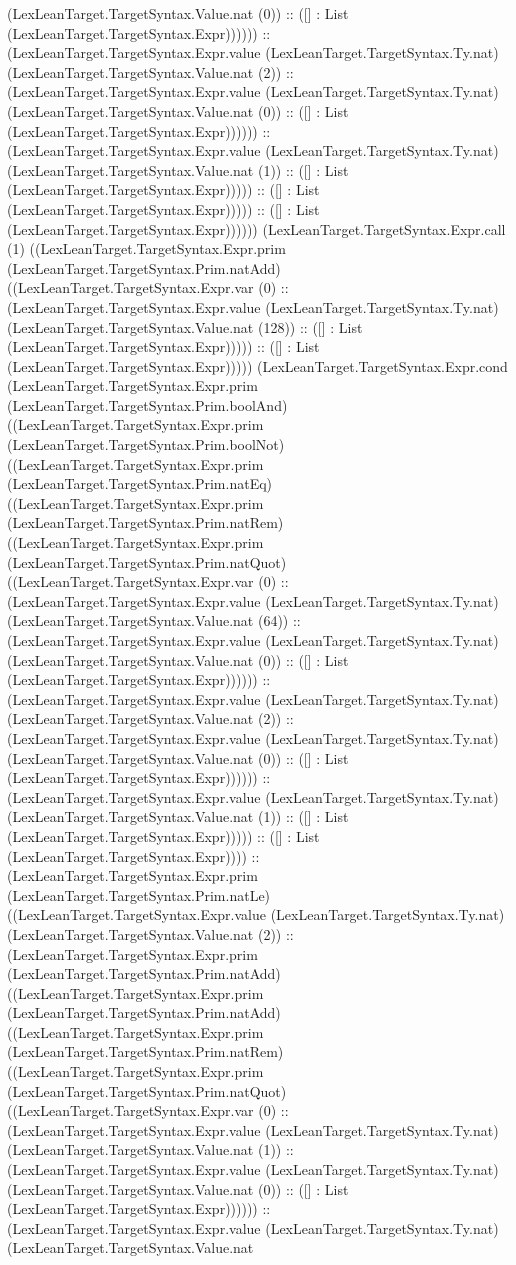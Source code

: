 \documentclass[11pt]{article}
\begin{document}
(LexLeanTarget.TargetSyntax.Value.nat (0)) :: ([] : List (LexLeanTarget.TargetSyntax.Expr)))))) :: (LexLeanTarget.TargetSyntax.Expr.value (LexLeanTarget.TargetSyntax.Ty.nat) (LexLeanTarget.TargetSyntax.Value.nat (2)) :: (LexLeanTarget.TargetSyntax.Expr.value (LexLeanTarget.TargetSyntax.Ty.nat) (LexLeanTarget.TargetSyntax.Value.nat (0)) :: ([] : List (LexLeanTarget.TargetSyntax.Expr)))))) :: (LexLeanTarget.TargetSyntax.Expr.value (LexLeanTarget.TargetSyntax.Ty.nat) (LexLeanTarget.TargetSyntax.Value.nat (1)) :: ([] : List (LexLeanTarget.TargetSyntax.Expr))))) :: ([] : List (LexLeanTarget.TargetSyntax.Expr))))) :: ([] : List (LexLeanTarget.TargetSyntax.Expr)))))) (LexLeanTarget.TargetSyntax.Expr.call (1) ((LexLeanTarget.TargetSyntax.Expr.prim (LexLeanTarget.TargetSyntax.Prim.natAdd) ((LexLeanTarget.TargetSyntax.Expr.var (0) :: (LexLeanTarget.TargetSyntax.Expr.value (LexLeanTarget.TargetSyntax.Ty.nat) (LexLeanTarget.TargetSyntax.Value.nat (128)) :: ([] : List (LexLeanTarget.TargetSyntax.Expr))))) :: ([] : List (LexLeanTarget.TargetSyntax.Expr))))) (LexLeanTarget.TargetSyntax.Expr.cond (LexLeanTarget.TargetSyntax.Expr.prim (LexLeanTarget.TargetSyntax.Prim.boolAnd) ((LexLeanTarget.TargetSyntax.Expr.prim (LexLeanTarget.TargetSyntax.Prim.boolNot) ((LexLeanTarget.TargetSyntax.Expr.prim (LexLeanTarget.TargetSyntax.Prim.natEq) ((LexLeanTarget.TargetSyntax.Expr.prim (LexLeanTarget.TargetSyntax.Prim.natRem) ((LexLeanTarget.TargetSyntax.Expr.prim (LexLeanTarget.TargetSyntax.Prim.natQuot) ((LexLeanTarget.TargetSyntax.Expr.var (0) :: (LexLeanTarget.TargetSyntax.Expr.value (LexLeanTarget.TargetSyntax.Ty.nat) (LexLeanTarget.TargetSyntax.Value.nat (64)) :: (LexLeanTarget.TargetSyntax.Expr.value (LexLeanTarget.TargetSyntax.Ty.nat) (LexLeanTarget.TargetSyntax.Value.nat (0)) :: ([] : List (LexLeanTarget.TargetSyntax.Expr)))))) :: (LexLeanTarget.TargetSyntax.Expr.value (LexLeanTarget.TargetSyntax.Ty.nat) (LexLeanTarget.TargetSyntax.Value.nat (2)) :: (LexLeanTarget.TargetSyntax.Expr.value (LexLeanTarget.TargetSyntax.Ty.nat) (LexLeanTarget.TargetSyntax.Value.nat (0)) :: ([] : List (LexLeanTarget.TargetSyntax.Expr)))))) :: (LexLeanTarget.TargetSyntax.Expr.value (LexLeanTarget.TargetSyntax.Ty.nat) (LexLeanTarget.TargetSyntax.Value.nat (1)) :: ([] : List (LexLeanTarget.TargetSyntax.Expr))))) :: ([] : List (LexLeanTarget.TargetSyntax.Expr)))) :: (LexLeanTarget.TargetSyntax.Expr.prim (LexLeanTarget.TargetSyntax.Prim.natLe) ((LexLeanTarget.TargetSyntax.Expr.value (LexLeanTarget.TargetSyntax.Ty.nat) (LexLeanTarget.TargetSyntax.Value.nat (2)) :: (LexLeanTarget.TargetSyntax.Expr.prim (LexLeanTarget.TargetSyntax.Prim.natAdd) ((LexLeanTarget.TargetSyntax.Expr.prim (LexLeanTarget.TargetSyntax.Prim.natAdd) ((LexLeanTarget.TargetSyntax.Expr.prim (LexLeanTarget.TargetSyntax.Prim.natRem) ((LexLeanTarget.TargetSyntax.Expr.prim (LexLeanTarget.TargetSyntax.Prim.natQuot) ((LexLeanTarget.TargetSyntax.Expr.var (0) :: (LexLeanTarget.TargetSyntax.Expr.value (LexLeanTarget.TargetSyntax.Ty.nat) (LexLeanTarget.TargetSyntax.Value.nat (1)) :: (LexLeanTarget.TargetSyntax.Expr.value (LexLeanTarget.TargetSyntax.Ty.nat) (LexLeanTarget.TargetSyntax.Value.nat (0)) :: ([] : List (LexLeanTarget.TargetSyntax.Expr)))))) :: (LexLeanTarget.TargetSyntax.Expr.value (LexLeanTarget.TargetSyntax.Ty.nat) (LexLeanTarget.TargetSyntax.Value.nat 
\end{document}
